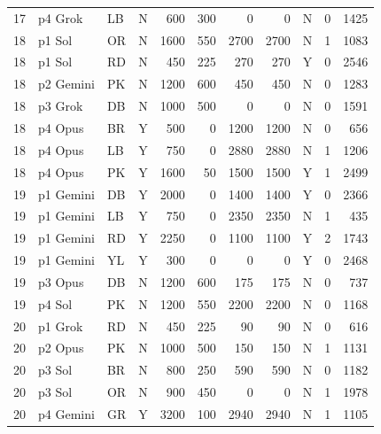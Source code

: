 \begin{longtable}{r l l l r r r r l r r}
17 & p4 Grok & LB & N & 600 & 300 & 0 & 0 & N & 0 & 1425 \\
18 & p1 Sol & OR & N & 1600 & 550 & 2700 & 2700 & N & 1 & 1083 \\
18 & p1 Sol & RD & N & 450 & 225 & 270 & 270 & Y & 0 & 2546 \\
18 & p2 Gemini & PK & N & 1200 & 600 & 450 & 450 & N & 0 & 1283 \\
18 & p3 Grok & DB & N & 1000 & 500 & 0 & 0 & N & 0 & 1591 \\
18 & p4 Opus & BR & Y & 500 & 0 & 1200 & 1200 & N & 0 & 656 \\
18 & p4 Opus & LB & Y & 750 & 0 & 2880 & 2880 & N & 1 & 1206 \\
18 & p4 Opus & PK & Y & 1600 & 50 & 1500 & 1500 & Y & 1 & 2499 \\
19 & p1 Gemini & DB & Y & 2000 & 0 & 1400 & 1400 & Y & 0 & 2366 \\
19 & p1 Gemini & LB & Y & 750 & 0 & 2350 & 2350 & N & 1 & 435 \\
19 & p1 Gemini & RD & Y & 2250 & 0 & 1100 & 1100 & Y & 2 & 1743 \\
19 & p1 Gemini & YL & Y & 300 & 0 & 0 & 0 & Y & 0 & 2468 \\
19 & p3 Opus & DB & N & 1200 & 600 & 175 & 175 & N & 0 & 737 \\
19 & p4 Sol & PK & N & 1200 & 550 & 2200 & 2200 & N & 0 & 1168 \\
20 & p1 Grok & RD & N & 450 & 225 & 90 & 90 & N & 0 & 616 \\
20 & p2 Opus & PK & N & 1000 & 500 & 150 & 150 & N & 1 & 1131 \\
20 & p3 Sol & BR & N & 800 & 250 & 590 & 590 & N & 0 & 1182 \\
20 & p3 Sol & OR & N & 900 & 450 & 0 & 0 & N & 1 & 1978 \\
20 & p4 Gemini & GR & Y & 3200 & 100 & 2940 & 2940 & N & 1 & 1105 \\
\end{longtable}
\endgroup
{}
